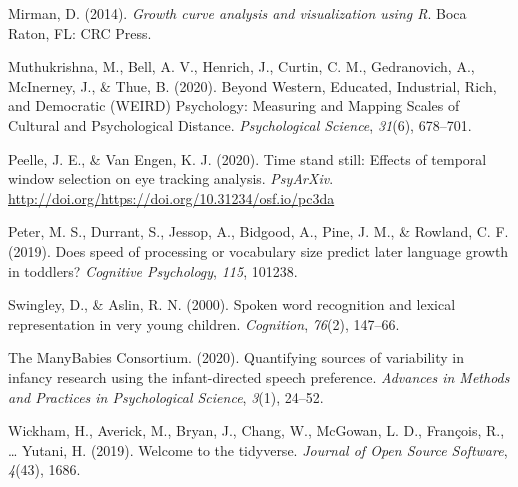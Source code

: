 \documentclass[10pt, letterpaper]{article}
\begin{document}
\leavevmode\hypertarget{ref-Mirman2014}{}%
Mirman, D. (2014). \emph{Growth curve analysis and visualization using
R}. Boca Raton, FL: CRC Press.

\leavevmode\hypertarget{ref-Muthukrishna2020}{}%
Muthukrishna, M., Bell, A. V., Henrich, J., Curtin, C. M., Gedranovich,
A., McInerney, J., \& Thue, B. (2020). Beyond Western, Educated,
Industrial, Rich, and Democratic (WEIRD) Psychology: Measuring and
Mapping Scales of Cultural and Psychological Distance.
\emph{Psychological Science}, \emph{31}(6), 678--701.

\leavevmode\hypertarget{ref-Peelle2020}{}%
Peelle, J. E., \& Van Engen, K. J. (2020). Time stand still: Effects of
temporal window selection on eye tracking analysis. \emph{PsyArXiv}.
\url{http://doi.org/https://doi.org/10.31234/osf.io/pc3da}

\leavevmode\hypertarget{ref-peter2019}{}%
Peter, M. S., Durrant, S., Jessop, A., Bidgood, A., Pine, J. M., \&
Rowland, C. F. (2019). Does speed of processing or vocabulary size
predict later language growth in toddlers? \emph{Cognitive Psychology},
\emph{115}, 101238.

\leavevmode\hypertarget{ref-Swingley2000}{}%
Swingley, D., \& Aslin, R. N. (2000). Spoken word recognition and
lexical representation in very young children. \emph{Cognition},
\emph{76}(2), 147--66.

\leavevmode\hypertarget{ref-TheManyBabiesConsortium2020}{}%
The ManyBabies Consortium. (2020). Quantifying sources of variability in
infancy research using the infant-directed speech preference.
\emph{Advances in Methods and Practices in Psychological Science},
\emph{3}(1), 24--52.

\leavevmode\hypertarget{ref-Wickham2019}{}%
Wickham, H., Averick, M., Bryan, J., Chang, W., McGowan, L. D.,
François, R., \ldots{} Yutani, H. (2019). Welcome to the tidyverse.
\emph{Journal of Open Source Software}, \emph{4}(43), 1686.


\end{document}
